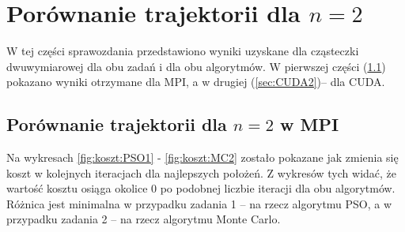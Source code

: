 \documentclass[11pt, a4paper, oneside]{article}
\begin{document}
\section{Porównanie trajektorii dla $n = 2$}

W tej części sprawozdania przedstawiono wyniki uzyskane dla cząsteczki dwuwymiarowej dla obu zadań i dla obu algorytmów. W pierwszej części (\ref{sec:MPI2}) pokazano wyniki otrzymane dla MPI, a w drugiej  (\ref{sec:CUDA2})-- dla CUDA.

\subsection{Porównanie trajektorii dla $n = 2$ w MPI} \label{sec:MPI2}

Na wykresach \ref{fig:koszt:PSO1} - \ref{fig:koszt:MC2} zostało pokazane jak zmienia się koszt w kolejnych iteracjach dla najlepszych położeń. Z wykresów tych widać, że wartość kosztu osiąga okolice 0 po podobnej liczbie iteracji dla obu algorytmów. Różnica jest minimalna w przypadku zadania 1 -- na rzecz algorytmu PSO, a w przypadku zadania 2 -- na rzecz algorytmu Monte Carlo.
\end{document}
